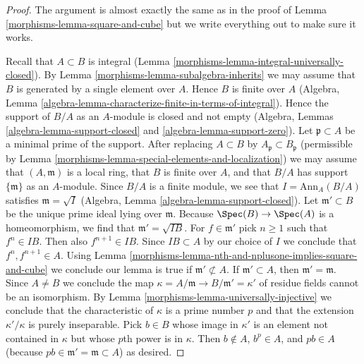\begin{proof}

The argument is almost exactly the same as in the proof of
Lemma \ref{morphisms-lemma-square-and-cube} but we write everything
out to make sure it works.

\medskip\noindent
Recall that $A \subset B$ is integral
(Lemma \ref{morphisms-lemma-integral-universally-closed}).
By Lemma \ref{morphisms-lemma-subalgebra-inherits}
we may assume that $B$ is generated by a single element
over $A$. Hence $B$ is finite over $A$
(Algebra, Lemma \ref{algebra-lemma-characterize-finite-in-terms-of-integral}).
Hence the support of $B/A$ as an $A$-module is
closed and not empty (Algebra, Lemmas
\ref{algebra-lemma-support-closed} and \ref{algebra-lemma-support-zero}).
Let $\mathfrak p \subset A$ be a minimal prime
of the support. After replacing $A \subset B$ by
$A_\mathfrak p \subset B_\mathfrak p$ (permissible by
Lemma \ref{morphisms-lemma-special-elements-and-localization})
we may assume that $(A, \mathfrak m)$ is a local ring,
that $B$ is finite over $A$, and that $B/A$ has support $\{\mathfrak m\}$
as an $A$-module. Since $B/A$ is a finite module,
we see that $I = \text{Ann}_A(B/A)$ satisfies $\mathfrak m = \sqrt{I}$
(Algebra, Lemma \ref{algebra-lemma-support-closed}).
Let $\mathfrak m' \subset B$ be the unique prime ideal lying over
$\mathfrak m$. Because $\Spec(B) \to \Spec(A)$ is a homeomorphism,
we find that $\mathfrak m' = \sqrt{IB}$.
For $f \in \mathfrak m'$ pick $n \geq 1$ such that
$f^n \in IB$. Then also $f^{n + 1} \in IB$.
Since $IB \subset A$ by our choice of $I$ we conclude that
$f^n, f^{n + 1} \in A$. Using
Lemma \ref{morphisms-lemma-nth-and-nplusone-implies-square-and-cube}
we conclude our lemma is true if $\mathfrak m' \not \subset A$.
If $\mathfrak m' \subset A$, then $\mathfrak m' = \mathfrak m$.
Since $A \not = B$ we conclude the map
$\kappa = A/\mathfrak m \to B/\mathfrak m' = \kappa'$
of residue fields cannot be an isomorphism. By
Lemma \ref{morphisms-lemma-universally-injective} we conclude
that the characteristic of $\kappa$ is a prime number $p$
and that the extension $\kappa'/\kappa$ is purely inseparable.
Pick $b \in B$ whose image in $\kappa'$ is an element
not contained in $\kappa$ but whose $p$th power is in $\kappa$.
Then $b \not \in A$, $b^p \in A$, and $pb \in A$
(because $pb \in \mathfrak m' = \mathfrak m \subset A$)
as desired.
\end{proof}

